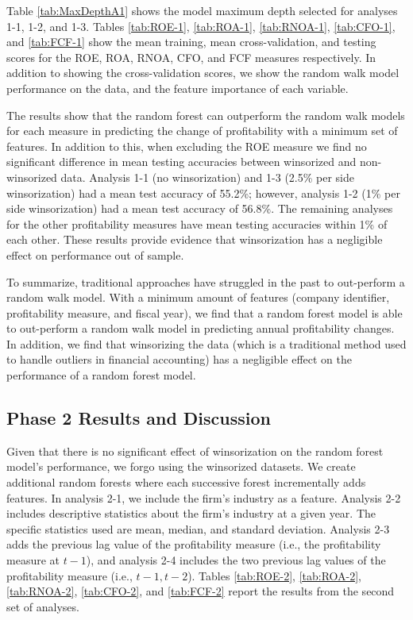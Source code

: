 Table \ref{tab:MaxDepthA1} shows the model maximum depth selected for analyses 1-1, 1-2, and 1-3. Tables \ref{tab:ROE-1},  \ref{tab:ROA-1}, \ref{tab:RNOA-1}, \ref{tab:CFO-1}, and \ref{tab:FCF-1} show the mean training, mean cross-validation, and testing scores for the ROE, ROA, RNOA, CFO, and FCF measures respectively. In addition to showing the cross-validation scores, we show the random walk model performance on the data,  and the feature importance of each variable. 

The results show that the random forest can outperform the random walk models for each measure in predicting the change of profitability with a minimum set of features. In addition to this, when excluding the ROE measure we find no significant difference in mean testing accuracies between winsorized and non-winsorized data. Analysis 1-1 (no winsorization) and 1-3 (2.5\% per side winsorization) had a mean test accuracy of 55.2\%; however, analysis 1-2 (1\% per side winsorization) had a mean test accuracy of 56.8\%. The remaining analyses for the other profitability measures have mean testing accuracies within 1\% of each other. These results provide evidence that winsorization has a negligible effect on performance out of sample.

To summarize,  traditional approaches have struggled in the past to out-perform a random walk model. With a minimum amount of features (company identifier, profitability measure, and fiscal year), we find that a random forest model is able to out-perform a random walk model in predicting annual profitability changes. In addition, we find that winsorizing the data (which is a traditional method used to handle outliers in financial accounting) has a negligible effect on the performance of a random forest model.

\subsection{Phase 2 Results and Discussion}

Given that there is no significant effect of winsorization on the random forest model's performance, we forgo using the winsorized datasets. We create additional random forests where each successive forest incrementally adds features. In analysis 2-1, we include the firm's industry as a feature. Analysis 2-2 includes descriptive statistics about the firm's industry at a given year. The specific statistics used are mean, median, and standard deviation. Analysis 2-3 adds the previous lag value of the profitability measure (i.e., the profitability measure at \(t-1\)), and analysis 2-4 includes the two previous lag values of the profitability measure (i.e., \(t-1, t-2\)). Tables \ref{tab:ROE-2}, \ref{tab:ROA-2}, \ref{tab:RNOA-2}, \ref{tab:CFO-2}, and \ref{tab:FCF-2} report the results from the second set of analyses. 

